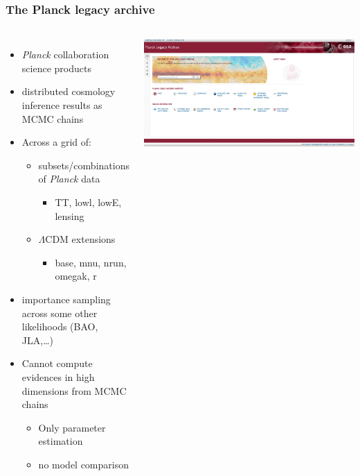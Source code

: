 \documentclass[aspectratio=169]{beamer}
\begin{document}
\begin{frame}
    \frametitle{The Planck legacy archive}
    \begin{columns}
        \begin{itemize}
            \item \textit{Planck} collaboration science products
            \item distributed cosmology inference results as MCMC chains
            \item Across a grid of:
                \begin{itemize}
                    \item subsets/combinations of \textit{Planck} data
                        \begin{itemize}
                            \item TT, lowl, lowE, lensing
                        \end{itemize}
                    \item $\Lambda$CDM extensions 
                        \begin{itemize}
                            \item base, mnu, nrun, omegak, r
                        \end{itemize}
                \end{itemize}
            \item importance sampling across some other likelihoods (BAO, JLA,\ldots)
            \item Cannot compute evidences in high dimensions from MCMC chains
                \begin{itemize}
                    \item Only parameter estimation
                    \item no model comparison
                \end{itemize}
        \end{itemize}
        \includegraphics[width=\textwidth]{figures/pla}

\end{columns}
\end{frame}
\end{document}
